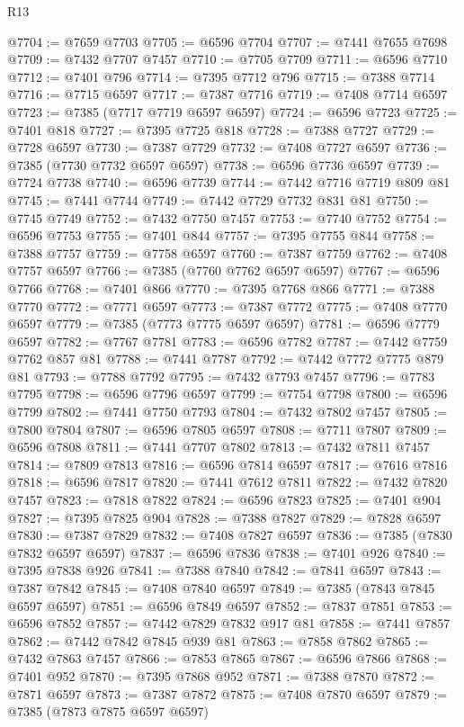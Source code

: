 \begin{lexlean}{R13}
\begin{coremodule}
@7704 := @7659 @7703
@7705 := @6596 @7704
@7707 := @7441 @7655 @7698
@7709 := @7432 @7707 @7457
@7710 := @7705 @7709
@7711 := @6596 @7710
@7712 := @7401 @796
@7714 := @7395 @7712 @796
@7715 := @7388 @7714
@7716 := @7715 @6597
@7717 := @7387 @7716
@7719 := @7408 @7714 @6597
@7723 := @7385 (@7717 @7719 @6597 @6597)
@7724 := @6596 @7723
@7725 := @7401 @818
@7727 := @7395 @7725 @818
@7728 := @7388 @7727
@7729 := @7728 @6597
@7730 := @7387 @7729
@7732 := @7408 @7727 @6597
@7736 := @7385 (@7730 @7732 @6597 @6597)
@7738 := @6596 @7736 @6597
@7739 := @7724 @7738
@7740 := @6596 @7739
@7744 := @7442 @7716 @7719 @809 @81
@7745 := @7441 @7744
@7749 := @7442 @7729 @7732 @831 @81
@7750 := @7745 @7749
@7752 := @7432 @7750 @7457
@7753 := @7740 @7752
@7754 := @6596 @7753
@7755 := @7401 @844
@7757 := @7395 @7755 @844
@7758 := @7388 @7757
@7759 := @7758 @6597
@7760 := @7387 @7759
@7762 := @7408 @7757 @6597
@7766 := @7385 (@7760 @7762 @6597 @6597)
@7767 := @6596 @7766
@7768 := @7401 @866
@7770 := @7395 @7768 @866
@7771 := @7388 @7770
@7772 := @7771 @6597
@7773 := @7387 @7772
@7775 := @7408 @7770 @6597
@7779 := @7385 (@7773 @7775 @6597 @6597)
@7781 := @6596 @7779 @6597
@7782 := @7767 @7781
@7783 := @6596 @7782
@7787 := @7442 @7759 @7762 @857 @81
@7788 := @7441 @7787
@7792 := @7442 @7772 @7775 @879 @81
@7793 := @7788 @7792
@7795 := @7432 @7793 @7457
@7796 := @7783 @7795
@7798 := @6596 @7796 @6597
@7799 := @7754 @7798
@7800 := @6596 @7799
@7802 := @7441 @7750 @7793
@7804 := @7432 @7802 @7457
@7805 := @7800 @7804
@7807 := @6596 @7805 @6597
@7808 := @7711 @7807
@7809 := @6596 @7808
@7811 := @7441 @7707 @7802
@7813 := @7432 @7811 @7457
@7814 := @7809 @7813
@7816 := @6596 @7814 @6597
@7817 := @7616 @7816
@7818 := @6596 @7817
@7820 := @7441 @7612 @7811
@7822 := @7432 @7820 @7457
@7823 := @7818 @7822
@7824 := @6596 @7823
@7825 := @7401 @904
@7827 := @7395 @7825 @904
@7828 := @7388 @7827
@7829 := @7828 @6597
@7830 := @7387 @7829
@7832 := @7408 @7827 @6597
@7836 := @7385 (@7830 @7832 @6597 @6597)
@7837 := @6596 @7836
@7838 := @7401 @926
@7840 := @7395 @7838 @926
@7841 := @7388 @7840
@7842 := @7841 @6597
@7843 := @7387 @7842
@7845 := @7408 @7840 @6597
@7849 := @7385 (@7843 @7845 @6597 @6597)
@7851 := @6596 @7849 @6597
@7852 := @7837 @7851
@7853 := @6596 @7852
@7857 := @7442 @7829 @7832 @917 @81
@7858 := @7441 @7857
@7862 := @7442 @7842 @7845 @939 @81
@7863 := @7858 @7862
@7865 := @7432 @7863 @7457
@7866 := @7853 @7865
@7867 := @6596 @7866
@7868 := @7401 @952
@7870 := @7395 @7868 @952
@7871 := @7388 @7870
@7872 := @7871 @6597
@7873 := @7387 @7872
@7875 := @7408 @7870 @6597
@7879 := @7385 (@7873 @7875 @6597 @6597)

\end{coremodule}
\end{lexlean}
